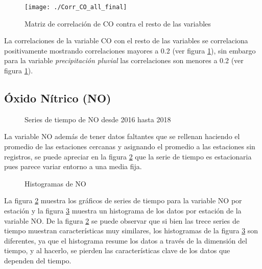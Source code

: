 \begin{figure}[H]
\centering
\texttt{[image: ./Corr\_CO\_all\_final]}
\caption{Matriz de correlación de CO contra el resto de las variables}
\label{corrCO}
\end{figure}


La correlaciones de la variable CO con el resto de las variables se correlaciona positivamente mostrando correlaciones mayores a 0.2 (ver figura \ref{corrCO}), sin embargo para la variable {\em precipitación pluvial} las correlaciones son menores a 0.2 (ver figura \ref{corrCO}).






\subsection{Óxido Nítrico (NO)}
\begin{figure}[H]
\centering
{}
\caption{Series de tiempo de NO desde 2016 hasta 2018}
\label{serieNO}
\end{figure}

La variable NO además de tener datos faltantes que se rellenan haciendo el promedio de las estaciones cercanas y asignando el promedio a las estaciones sin registros, se puede apreciar en la figura \ref{serieNO} que la serie de tiempo es estacionaria pues parece variar entorno a una media fija.

\begin{figure}[H]
\centering
{}
\caption{Histogramas de NO}
\label{histNO}
\end{figure}

La figura \ref{serieNO} muestra los gráficos de series de tiempo para la variable NO por estación y la figura \ref{histNO} muestra un histograma de los datos por estación de la variable NO. De la figura \ref{serieNO} se puede observar que si bien las trece series de tiempo muestran características muy similares, los histogramas de la figura \ref{histNO} son diferentes, ya que el histograma resume los datos a través de la dimensión del tiempo, y al hacerlo, se pierden las características clave de los datos que dependen del tiempo.

